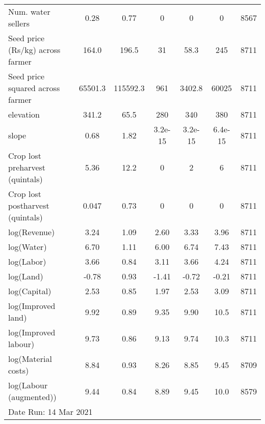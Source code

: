 \begin{table}[htbp]
\begin{tabular*}{1.0\hsize}{@{\hskip\tabcolsep\extracolsep\fill}l*{1}{cccccc}}
Num. water sellers                  &        0.28&        0.77&           0&           0&           0&        8567\\
Seed price (Rs/kg) across farmer    &       164.0&       196.5&          31&        58.3&         245&        8711\\
Seed price squared across farmer    &     65501.3&    115592.3&         961&      3402.8&       60025&        8711\\
elevation                           &       341.2&        65.5&         280&         340&         380&        8711\\
slope                               &        0.68&        1.82&     3.2e-15&     3.2e-15&     6.4e-15&        8711\\
Crop lost preharvest (quintals)     &        5.36&        12.2&           0&           2&           6&        8711\\
Crop lost postharvest (quintals)    &       0.047&        0.73&           0&           0&           0&        8711\\
log(Revenue)                        &        3.24&        1.09&        2.60&        3.33&        3.96&        8711\\
log(Water)                          &        6.70&        1.11&        6.00&        6.74&        7.43&        8711\\
log(Labor)                          &        3.66&        0.84&        3.11&        3.66&        4.24&        8711\\
log(Land)                           &       -0.78&        0.93&       -1.41&       -0.72&       -0.21&        8711\\
log(Capital)                        &        2.53&        0.85&        1.97&        2.53&        3.09&        8711\\
log(Improved land)                  &        9.92&        0.89&        9.35&        9.90&        10.5&        8711\\
log(Improved labour)                &        9.73&        0.86&        9.13&        9.74&        10.3&        8711\\
log(Material costs)                 &        8.84&        0.93&        8.26&        8.85&        9.45&        8709\\
log(Labour (augmented))             &        9.44&        0.84&        8.89&        9.45&        10.0&        8579\\
\bottomrule
\multicolumn{7}{l}{\footnotesize Date Run: 14 Mar 2021}\\
\end{tabular*}
\end{table}

